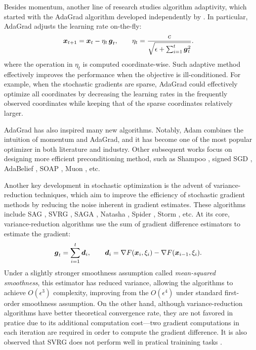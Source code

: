 
Besides momentum, another line of research studies algorithm adaptivity, which started with the AdaGrad algorithm developed independently by \citep{duchi10adagrad,mcmahan2010adaptive}. In particular, AdaGrad adjusts the learning rate on-the-fly:
\begin{equation}
    {\boldsymbol{x}}_{t+1} = {\boldsymbol{x}}_t - \eta_t\, {\boldsymbol{g}}_t,
    \qquad \eta_t = \frac{c}{\sqrt{\epsilon + \sum_{i=1}^t {\boldsymbol{g}}_t^2}}.
    \label{eqn:ch1:adagrad-update}
\end{equation}
where the operation in $\eta_t$ is computed coordinate-wise. Such adaptive method effectively improves the performance when the objective is ill-conditioned. For example, when the stochastic gradients are sparse, AdaGrad could effectively optimize all coordinates by decreasing the learning rates in the frequently observed coordinates while keeping that of the sparse coordinates relatively larger. 

AdaGrad has also inspired many new algorithms. Notably, Adam \citep{kingma2014adam} combines the intuition of momentum and AdaGrad, and it has become one of the most popular optimizer in both literature and industry. Other subsequent works focus on designing more efficient preconditioning method, such as Shampoo \citep{gupta2018shampoo}, signed SGD \citep{bernstein2018signsgd}, AdaBelief \citep{zhuang2020adabelief}, SOAP \citep{vyas2025soap}, Muon \citep{jordan2024muon}, etc.


Another key development in stochastic optimization is the advent of variance-reduction techniques, which aim to improve the efficiency of stochastic gradient methods by reducing the noise inherent in gradient estimates. These algorithms include SAG \citep{schmidt2017minimizing}, SVRG \citep{johnson2013accelerating}, SAGA \citep{defazio2014saga}, Natasha \citep{allenzhu2018natasha}, Spider \citep{fang2018spider}, Storm \citep{cutkosky2019momentum}, etc. At its core, variance-reduction algorithms use the sum of gradient difference estimators to estimate the gradient:
\begin{equation}
    {\boldsymbol{g}}_t = \sum_{i=1}^t {\boldsymbol{d}}_i, \qquad {\boldsymbol{d}}_i = \nabla F({\boldsymbol{x}}_i,\xi_i) - \nabla F({\boldsymbol{x}}_{i-1}, \xi_i).
    \label{eqn:ch1:variance-reduction}
\end{equation}
Under a slightly stronger smoothness assumption called \emph{mean-squared smoothness}, this estimator has reduced variance, allowing the algorithms to achieve $O(\epsilon^3)$ complexity, improving from the $O(\epsilon^4)$ under standard first-order smoothness assumption. On the other hand, although variance-reduction algorithms have better theoretical convergence rate, they are not favored in pratice due to its additional computation cost---two gradient computations in each iteration are required in order to compute the gradient difference. It is also observed that SVRG does not perform well in pratical trainining tasks \citep{defazio2019ineffectiveness}.


